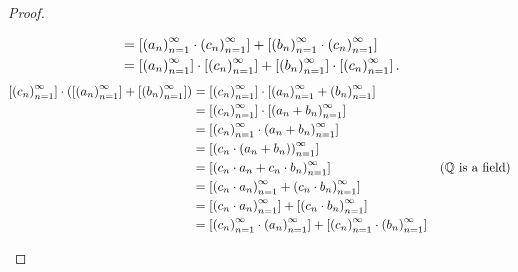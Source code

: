 \begin{proof}
\begin{enumerate}[label={(F\arabic*)},itemsep=0pt,start=5]
\begin{align*}
                                                                                                 & = \left[{{\left({a_{n}}\right)}^{\infty}_{n=1}\cdot{\left({c_{n}}\right)}^{\infty}_{n=1}}\right] + \left[{{\left({b_{n}}\right)}^{\infty}_{n=1}\cdot{\left({c_{n}}\right)}^{\infty}_{n=1}}\right]                                                     \\
                                                                                                 & = \left[{{\left({a_{n}}\right)}^{\infty}_{n=1}}\right]\cdot\left[{{\left({c_{n}}\right)}^{\infty}_{n=1}}\right] + \left[{{\left({b_{n}}\right)}^{\infty}_{n=1}}\right]\cdot\left[{{\left({c_{n}}\right)}^{\infty}_{n=1}}\right].
              \end{align*}
              \begin{align*}
                  \class{\seq{c_{n}}}\cdot\left(\class{\seq{a_{n}}} + \class{\seq{b_{n}}}\right) & = \class{\seq{c_{n}}}\cdot\class{\seq{a_{n}} + \seq{b_{n}}}                                                                     \\
                                                                                                 & = \class{\seq{c_{n}}}\cdot\class{\seq{a_{n} + b_{n}}}                                                                           \\
                                                                                                 & = \class{\seq{c_{n}}\cdot\seq{a_{n} + b_{n}}}                                                                                   \\
                                                                                                 & = \class{\seq{c_{n}\cdot (a_{n} + b_{n})}}                                                                                      \\
                                                                                                 & = \class{\seq{c_{n}\cdot a_{n} + c_{n}\cdot b_{n}}}                                          & \text{($\mathbb{Q}$ is a field)} \\
                                                                                                 & = \class{\seq{c_{n}\cdot a_{n}} + \seq{c_{n}\cdot b_{n}}}                                                                       \\
                                                                                                 & = \class{\seq{c_{n}\cdot a_{n}}} + \class{\seq{c_{n}\cdot b_{n}}}                                                               \\
                                                                                                 & = \class{\seq{c_{n}}\cdot\seq{a_{n}}} + \class{\seq{c_{n}}\cdot\seq{b_{n}}}                                                     \\

\end{align*}
\end{enumerate}
\end{proof}
